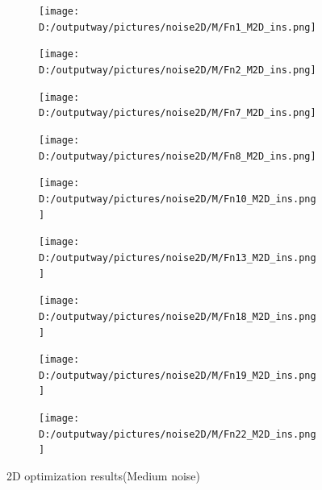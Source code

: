\documentclass{article}
\begin{document}
\begin{figure}[H]
    \centering
    \begin{subfigure}[t]{.32\linewidth}
        \centering
        \texttt{[image: D:/outputway/pictures/noise2D/M/Fn1\_M2D\_ins.png]}
    \end{subfigure}
    \begin{subfigure}[t]{.32\linewidth}
        \centering
        \texttt{[image: D:/outputway/pictures/noise2D/M/Fn2\_M2D\_ins.png]}
    \end{subfigure}
    \begin{subfigure}[t]{.32\linewidth}
        \centering
        \texttt{[image: D:/outputway/pictures/noise2D/M/Fn7\_M2D\_ins.png]}
    \end{subfigure}
    \begin{subfigure}[t]{.32\linewidth}
        \centering
        \texttt{[image: D:/outputway/pictures/noise2D/M/Fn8\_M2D\_ins.png]}
    \end{subfigure}
    \begin{subfigure}[t]{.32\linewidth}
        \centering
        \texttt{[image: D:/outputway/pictures/noise2D/M/Fn10\_M2D\_ins.png]}
    \end{subfigure}
    \begin{subfigure}[t]{.32\linewidth}
        \centering
        \texttt{[image: D:/outputway/pictures/noise2D/M/Fn13\_M2D\_ins.png]}
    \end{subfigure}
    \begin{subfigure}[t]{.32\linewidth}
        \centering
        \texttt{[image: D:/outputway/pictures/noise2D/M/Fn18\_M2D\_ins.png]}
    \end{subfigure}
    \begin{subfigure}[t]{.32\linewidth}
        \centering
        \texttt{[image: D:/outputway/pictures/noise2D/M/Fn19\_M2D\_ins.png]}
    \end{subfigure}
    \begin{subfigure}[t]{.32\linewidth}
        \centering
        \texttt{[image: D:/outputway/pictures/noise2D/M/Fn22\_M2D\_ins.png]}
    \end{subfigure}
    \caption{2D optimization results(Medium noise)}
    \label{Fig3}
\end{figure}
\end{document}
